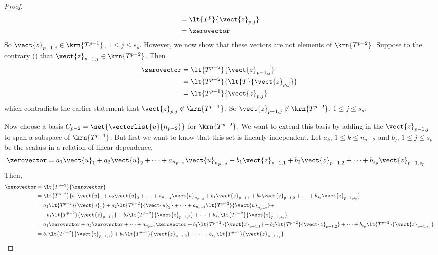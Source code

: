 \begin{proof}
\begin{align*}
&=\lt{T^{p}}{\vect{z}_{p,j}}\\
&=\zerovector
\end{align*}
%
So $\vect{z}_{p-1,j}\in\krn{T^{p-1}}$, $1\leq j\leq s_p$.  However, we now show that these vectors are not elements of $\krn{T^{p-2}}$.  Suppose to the contrary () that $\vect{z}_{p-1,j}\in\krn{T^{p-2}}$.  Then
%
\begin{align*}
\zerovector
&=\lt{T^{p-2}}{\vect{z}_{p-1,j}}\\
&=\lt{T^{p-2}}{\lt{T}{\vect{z}_{p,j}}}\\
&=\lt{T^{p-1}}{\vect{z}_{p,j}}\\
\end{align*}
%
which contradicts the earlier statement that $\vect{z}_{p,j}\not\in\krn{T^{p-1}}$.  So $\vect{z}_{p-1,j}\not\in\krn{T^{p-2}}$, $1\leq j\leq s_p$.\par
%
Now choose a basis $C_{p-2}=\set{\vectorlist{u}{n_{p-2}}}$ for $\krn{T^{p-2}}$.  We want to extend this basis by adding in the $\vect{z}_{p-1,j}$ to span a subspace of $\krn{T^{p-1}}$.  But first we want to know that this set is linearly independent.  Let $a_k$, $1\leq k\leq n_{p-2}$ and $b_j$, $1\leq j\leq s_p$ be the scalars in a relation of linear dependence,
%
\begin{align*}
\zerovector
&=
a_1\vect{u}_1+
a_2\vect{u}_2+
\cdots+
a_{n_{p-2}}\vect{u}_{n_{p-2}}
+
b_1\vect{z}_{p-1,1}+
b_2\vect{z}_{p-1,2}+
\cdots+
b_{s_p}\vect{z}_{p-1,s_p}
\end{align*}
%
Then,
%
\begin{align*}
\zerovector
&=\lt{T^{p-2}}{\zerovector}\\
&=\lt{T^{p-2}}{
a_1\vect{u}_1+
a_2\vect{u}_2+
\cdots+
a_{n_{p-2}}\vect{u}_{n_{p-2}}
+
b_1\vect{z}_{p-1,1}+
b_2\vect{z}_{p-1,2}+
\cdots+
b_{s_p}\vect{z}_{p-1,s_p}
}\\
%
&=
a_1\lt{T^{p-2}}{\vect{u}_1}+
a_2\lt{T^{p-2}}{\vect{u}_2}+
\cdots+
a_{n_{p-2}}\lt{T^{p-2}}{\vect{u}_{n_{p-2}}}
+\\
&\quad\quad
b_1\lt{T^{p-2}}{\vect{z}_{p-1,1}}+
b_2\lt{T^{p-2}}{\vect{z}_{p-1,2}}+
\cdots+
b_{s_p}\lt{T^{p-2}}{\vect{z}_{p-1,s_p}}\\
%
&=
a_1\zerovector+
a_2\zerovector+
\cdots+
a_{n_{p-2}}\zerovector
+
b_1\lt{T^{p-2}}{\vect{z}_{p-1,1}}+
b_2\lt{T^{p-2}}{\vect{z}_{p-1,2}}+
\cdots+
b_{s_p}\lt{T^{p-2}}{\vect{z}_{p-1,s_p}}\\
%
&=
b_1\lt{T^{p-2}}{\vect{z}_{p-1,1}}+
b_2\lt{T^{p-2}}{\vect{z}_{p-1,2}}+
\cdots+
b_{s_p}\lt{T^{p-2}}{\vect{z}_{p-1,s_p}}\\

\end{align*}
\end{proof}
